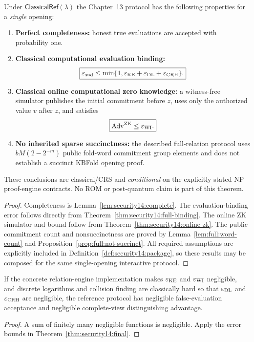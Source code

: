 \begin{theorem}\label{thm:security14:final}
Under
$\mathsf{ClassicalRef}(\lambda)$
the Chapter~13 protocol
has the following properties
for a \emph{single} opening:
\begin{enumerate}[label=\textup{(\roman*)}]
\item \textbf{Perfect completeness:}
honest true evaluations
are accepted with probability one.
\item \textbf{Classical computational
evaluation binding:}
\[
 \boxed{\varepsilon_{\rm snd}
 \le \min\{1,
 \varepsilon_{\rm KE}
 +\varepsilon_{\rm DL}
 +\varepsilon_{\rm CRH}\}.}
\]
\item \textbf{Classical online
computational zero knowledge:}
a witness-free simulator
publishes the initial
commitment before $z$,
uses only the authorized
value $v$ after $z$,
and satisfies
\[
 \boxed{
 \operatorname{Adv}^{\rm ZK}
 \le\varepsilon_{\rm WI}.}
\]
\item \textbf{No inherited
sparse succinctness:}
the described full-relation
protocol uses
$bM(2-2^{-m})$ public
fold-word commitment
group elements and
does not establish a
succinct KBFold
opening proof.
\end{enumerate}
These conclusions are
classical/CRS and
\emph{conditional} on
the explicitly stated
NP proof-engine contracts.
No ROM or post-quantum
claim is part of this theorem.
\end{theorem}
\begin{proof}
Completeness is
Lemma~\ref{lem:security14:complete}.
The evaluation-binding
error follows directly
from
Theorem~\ref{thm:security14:full-binding}.
The online ZK simulator
and bound follow from
Theorem~\ref{thm:security14:online-zk}.
The public commitment
count and nonsuccinctness
are proved by
Lemma~\ref{lem:full:word-count}
and
Proposition~\ref{prop:full:not-succinct}.
All required assumptions
are explicitly included
in
Definition~\ref{def:security14:package},
so these results may
be composed for the
same single-opening
interactive protocol.
\end{proof}

\begin{corollary}\label{cor:security14:negligible}
If the concrete relation-engine
implementation makes
$\varepsilon_{\rm KE}$ and
$\varepsilon_{\rm WI}$
negligible, and
discrete logarithms
and collision finding
are classically hard
so that
$\varepsilon_{\rm DL}$
and $\varepsilon_{\rm CRH}$
are negligible, the
reference protocol
has negligible
false-evaluation
acceptance and negligible
complete-view
distinguishing advantage.
\end{corollary}
\begin{proof}
A sum of finitely
many negligible functions
is negligible.
Apply the error
bounds in
Theorem~\ref{thm:security14:final}.
\end{proof}

